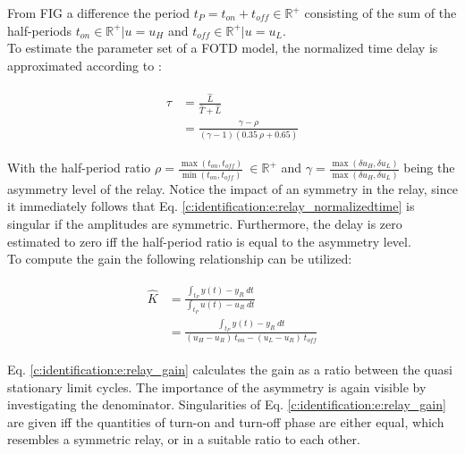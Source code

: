 From FIG a difference the period $t_P = t_{on} + t_{off}\in \mathbb{R}^+$ consisting of the sum of the half-periods $t_{on} \in \mathbb{R}^+ | u = u_H$ and $t_{off} \in \mathbb{R}^+ | u = u_L$.\\

To estimate the parameter set of a FOTD model, the normalized time delay is approximated according to \cite[p.26 f.]{Berner2015}:

\begin{align}
\begin{split}
\tau &= \frac{\hat{L}}{\hat{T}+\hat{L}} \\
 &= \frac{\gamma - \rho}{ \left(\gamma - 1\right)\left(0.35~\rho+0.65\right)}
\end{split}
\label{c:identification:e:relay_normalizedtime}
\end{align}

With the half-period ratio $\rho = \frac{\max\left(t_{on},t_{off} \right)}{\min\left(t_{on},t_{off} \right)} ~\in \mathbb{R}^+$ and $\gamma = \frac{\max\left(\delta u_H, \delta u_L \right)}{\max\left(\delta u_H, \delta u_L \right)}$ being the asymmetry level of the relay. Notice the impact of an symmetry in the relay, since it immediately follows that Eq. \ref{c:identification:e:relay_normalizedtime} is singular if the amplitudes are symmetric. Furthermore, the delay is zero estimated to zero iff the half-period ratio is equal to the asymmetry level.\\

To compute the gain the following relationship can be utilized:

\begin{align}
\begin{split}
\hat{K} &= \frac{\int_{t_P} y(t)-y_R~dt}{\int_{t_P} u(t)-u_R~dt} \\
&= \frac{\int_{t_P} y(t)-y_R~dt}{ \left( u_H -u_R \right)~t_{on} - \left( u_L - u_R \right)~t_{off}} 
\end{split}
\label{c:identification:e:relay_gain}
\end{align}

Eq. \ref{c:identification:e:relay_gain} calculates the gain as a ratio between the quasi stationary limit cycles. The importance of the asymmetry is again visible by investigating the denominator. Singularities of Eq. \ref{c:identification:e:relay_gain} are given iff the quantities of turn-on and turn-off phase are either equal, which resembles a symmetric relay, or in a suitable ratio to each other.\\

